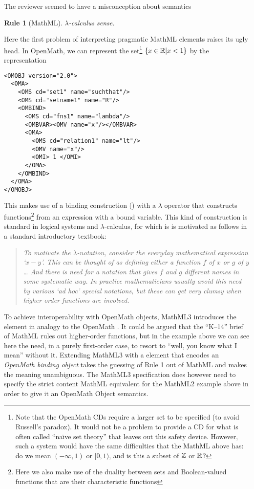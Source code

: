 \documentclass{llncs}
\newtheorem{Rule}{Rule}
\begin{document}
\begin{newpart}{The reviewer seemed to have a misconception about semantics}
\begin{Rule}[MathML]
$\lambda$-calculus sense.
\end{Rule}
\par
Here the first problem of interpreting pragmatic MathML elements raises its ugly head. In
OpenMath, we can represent the set\footnote{Note that the OpenMath CDs
  require a larger set to be specified (to avoid Russell's paradox). It would not be a
  problem to provide a CD for what is often called ``na\"\i{}ve set theory'' that leaves out
  this safety device. However, such a system would have the same difficulties that the MathML
  above has: do we mean $(-\infty,1)$ or $[0,1)$, and is this a subset of $\mathbb{Z}$ or $\mathbb{R}$?}
$\{x\in\mathbb{R} | x < 1\}$ by the representation
\begin{lstlisting}
<OMOBJ version="2.0">
  <OMA>
    <OMS cd="set1" name="suchthat"/>
    <OMS cd="setname1" name="R"/>
    <OMBIND>
      <OMS cd="fns1" name="lambda"/>
      <OMBVAR><OMV name="x"/></OMBVAR>
      <OMA>
        <OMS cd="relation1" name="lt"/>
        <OMV name="x"/>
        <OMI> 1 </OMI>
      </OMA>
    </OMBIND>
  </OMA>
</OMOBJ>
\end{lstlisting}
This makes use of a binding construction () with a $\lambda$ operator that
constructs functions\footnote{Here we also make use of the duality between sets and
  Boolean-valued functions that are their characteristic functions} from an expression
with a bound variable. This kind of construction is standard in logical systems and
$\lambda$-calculus, for which is is motivated as follows in a standard introductory
textbook:
\begin{quotation}\noindent\em
  To motivate the $\lambda$-notation, consider the everyday mathematical expression
  `$x-y$'. This can be thought of as defining either a function $f$ of $x$ or $g$ of $y$
  \dots{} And there is need for a notation that gives $f$ and $g$ different names in some
  systematic way. In practice mathematicians usually avoid this need by various `ad hoc'
  special notations, but these can get very clumsy when higher-order functions are
  involved.\hfill\hbox{\rm\cite[p. 1]{HindleySeldin2008}}
\end{quotation}
To achieve interoperability with OpenMath objects, MathML3 introduces the {}
element in analogy to the OpenMath {}. It could be argued that the
``K--14'' brief of MathML rules out higher-order functions, but in the example above we
can see here the need, in a purely first-order case, to resort to ``well, you know what I
mean'' without it. Extending MathML3 with a {} element that encodes an
{\emph{OpenMath binding object}} takes the guessing of Rule 1 out of MathML and makes the
meaning unambiguous. The MathML3 specification does however need to specify the strict
content MathML equivalent for the MathML2 example above in order to give it an OpenMath
Object semantics.\iffull{}\fi



\end{newpart}
\end{document}
